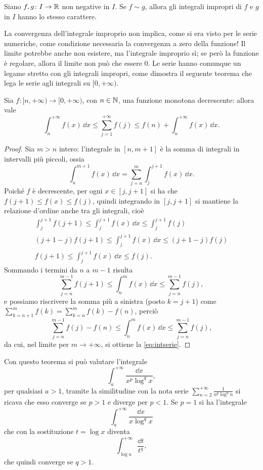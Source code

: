 \begin{corollario} \label{t:confronto_asintotico_int}
Siano $f,g\colon I\to\mathbb{R}$ non negative in $I$. Se $f\sim g$, allora gli integrali impropri di $f$ e $g$ in $I$ hanno lo stesso carattere.
\end{corollario}
La convergenza dell'integrale improprio non implica, come si era visto per le serie numeriche, come condizione necessaria la convergenza a zero della funzione! Il limite potrebbe anche non esistere, ma l'integrale improprio sì; se però la funzione è regolare, allora il limite non può che essere 0. Le serie hanno comunque un legame stretto con gli integrali impropri, come dimostra il seguente teorema che lega le serie agli integrali su $[0,+\infty)$.
\begin{teorema} \label{t:intserie}
	Sia $f\colon[n,+\infty)\to[0,+\infty)$, con $n\in\mathbb{N}$, una funzione monotona decrescente: allora vale
	\begin{equation} \label{eq:intserie}
		\int_n^{+\infty} f(x)\,\dd x\leq\sum_{j=1}^{+\infty}f(j)\leq f(n)+\int_n^{+\infty} f(x)\,\dd x.
	\end{equation}
\end{teorema}
\begin{proof}
	Sia $m>n$ intero: l'integrale in $[n,m+1]$ è la somma di integrali in intervalli più piccoli, ossia
	\begin{equation}
		\int_n^{m+1}f(x)\,\dd x=\sum_{j=n}^{m}\int_j^{j+1}f(x)\,\dd x.
	\end{equation}
	Poiché $f$ è decrescente, per ogni $x\in[j,j+1]$ si ha che $f(j+1)\leq f(x)\leq f(j)$, quindi integrando in $[j,j+1]$ si mantiene la relazione d'ordine anche tra gli integrali, cioè
	\begin{gather*}
		\int_j^{j+1}f(j+1)\leq\int_j^{j+1}f(x)\,\dd x\leq\int_j^{j+1}f(j)\\
		(j+1-j)f(j+1)\leq\int_j^{j+1}f(x)\,\dd x\leq(j+1-j)f(j)\\
		f(j+1)\leq\int_j^{j+1}f(x)\,\dd x\leq f(j).
	\end{gather*}
	Sommando i termini da $n$ a $m-1$ risulta
	\begin{equation}
		\sum_{j=n}^{m-1}f(j+1)\leq\int_n^m f(x)\,\dd x\leq\sum_{j=n}^{m-1}f(j),
	\end{equation}
	e possiamo riscrivere la somma più a sinistra (posto $k=j+1$) come $\sum_{k=n+1}^mf(k)=\sum_{k=n}^mf(k)-f(n)$, perciò
	\begin{equation}
		\sum_{j=n}^{m-1}f(j)-f(n)\le\int_n^m f(x)\,\dd x\le\sum_{j=n}^{m-1}f(j),
	\end{equation}
	da cui, nel limite per $m\to+\infty$, si ottiene la \eqref{eq:intserie}.
\end{proof}
Con questo teorema si può valutare l'integrale
\[
\int_a^{+\infty}\frac{\dd x}{x^p\log^qx},
\]
per qualsiasi $a>1$, tramite la similitudine con la nota serie $\sum_{n=2}^{+\infty}\frac1{n^p\log^qn}$ si ricava che esso converge se $p>1$ e diverge per $p<1$. Se $p=1$ si ha l'integrale
\[
\int_a^{+\infty}\frac{\dd x}{x\log^qx}
\]
che con la sostituzione $t=\log x$ diventa
\[
\int_{\log a}^{+\infty}\frac{\dd t}{t^q},
\]
che quindi converge se $q>1$.
